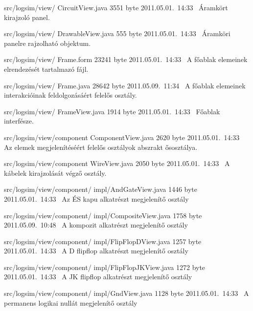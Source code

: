 \begin{fajllista}
\fajl
{src/logsim/view/\newline
CircuitView.java}
{3551 byte}
{2011.05.01.~14:33~}
{Áramkört kirajzoló panel.}

\fajl
{src/logsim/view/\newline
DrawableView.java}
{555 byte}
{2011.05.01.~14:33~}
{Áramköri panelre rajzolható objektum.}

\fajl
{src/logsim/view/\newline
Frame.form}
{23241 byte}
{2011.05.01.~14:33~}
{A főablak elemeinek elrendezését tartalmazó fájl.}

\fajl
{src/logsim/view/\newline
Frame.java}
{28642 byte}
{2011.05.09.~11:34~}
{A főablak elemeinek interakcióinak feldolgozásáért felelős osztály.}

\fajl
{src/logsim/view/\newline
FrameView.java}
{1914 byte}
{2011.05.01.~14:33~}
{Főablak interfésze.}

\fajl
{src/logsim/view/component\newline
ComponentView.java}
{2620 byte}
{2011.05.01.~14:33~}
{Az elemek megjelenítéséért felelős osztályok abszrakt ősosztálya.}

\fajl
{src/logsim/view/component\newline
WireView.java}
{2050 byte}
{2011.05.01.~14:33~}
{A kábelek kirajzolását végző osztály.}

\fajl
{src/logsim/view/component/\newline
impl/AndGateView.java} %
{1446 byte} %
{2011.05.01.~14:33~} %
{Az ÉS kapu alkatrészt megjelenítő osztály} %

\fajl
{src/logsim/view/component/\newline
impl/CompositeView.java}
{1758 byte}
{2011.05.09.~10:48~}
{A kompozit alkatrészt megjelenítő osztály}

\fajl
{src/logsim/view/component/\newline
impl/FlipFlopDView.java} %
{1257 byte} %
{2011.05.01.~14:33~} %
{A D flipflop alkatrészt megjelenítő osztály} %

\fajl
{src/logsim/view/component/\newline
impl/FlipFlopJKView.java} %
{1272 byte} %
{2011.05.01.~14:33~} %
{A JK flipflop alkatrészt megjelenítő osztály} %

\fajl
{src/logsim/view/component/\newline
impl/GndView.java} %
{1128 byte} %
{2011.05.01.~14:33~} %
{A permanens logikai nullát megjelenítő osztály} %


\end{fajllista}
